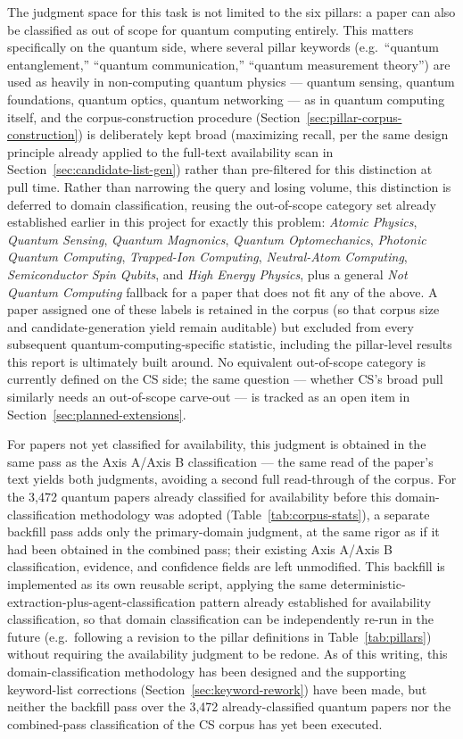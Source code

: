 \documentclass[11pt]{article}
\begin{document}
The judgment space for this task is not limited to the six pillars: a paper can also
be classified as out of scope for quantum computing entirely. This matters
specifically on the quantum side, where several pillar keywords (e.g.\ ``quantum
entanglement,'' ``quantum communication,'' ``quantum measurement theory'') are used as
heavily in non-computing quantum physics --- quantum sensing, quantum foundations,
quantum optics, quantum networking --- as in quantum computing itself, and the
corpus-construction procedure (Section~\ref{sec:pillar-corpus-construction}) is
deliberately kept broad (maximizing recall, per the same design principle already
applied to the full-text availability scan in Section~\ref{sec:candidate-list-gen})
rather than pre-filtered for this distinction at pull time. Rather than narrowing the
query and losing volume, this distinction is deferred to domain classification, reusing
the out-of-scope category set already established earlier in this project for exactly
this problem: \emph{Atomic Physics}, \emph{Quantum Sensing}, \emph{Quantum
Magnonics}, \emph{Quantum Optomechanics}, \emph{Photonic Quantum Computing},
\emph{Trapped-Ion Computing}, \emph{Neutral-Atom Computing}, \emph{Semiconductor Spin
Qubits}, and \emph{High Energy Physics}, plus a general \emph{Not Quantum Computing}
fallback for a paper that does not fit any of the above. A paper assigned one of these
labels is retained in the corpus (so that corpus size and candidate-generation yield
remain auditable) but excluded from every subsequent quantum-computing-specific
statistic, including the pillar-level results this report is ultimately built around.
No equivalent out-of-scope category is currently defined on the CS side; the same
question --- whether CS's broad pull similarly needs an out-of-scope carve-out --- is
tracked as an open item in Section~\ref{sec:planned-extensions}.

For papers not yet classified for
availability, this judgment is obtained in the same pass as the Axis A/Axis B
classification --- the same read of the paper's text yields both judgments, avoiding a
second full read-through of the corpus. For the 3{,}472 quantum papers already
classified for availability before this domain-classification methodology was adopted
(Table~\ref{tab:corpus-stats}), a separate backfill pass adds only the primary-domain
judgment, at the same rigor as if it had been obtained in the combined pass; their
existing Axis A/Axis B classification, evidence, and confidence fields are left
unmodified. This backfill is implemented as its own reusable script, applying the same
deterministic-extraction-plus-agent-classification pattern already established for
availability classification, so that domain classification can be independently
re-run in the future (e.g.\ following a revision to the pillar definitions in
Table~\ref{tab:pillars}) without requiring the availability judgment to be redone. As
of this writing, this domain-classification methodology has been designed and the
supporting keyword-list corrections (Section~\ref{sec:keyword-rework}) have been made,
but neither the backfill pass over the 3{,}472 already-classified quantum papers nor
the combined-pass classification of the CS corpus has yet been executed.
\end{document}
